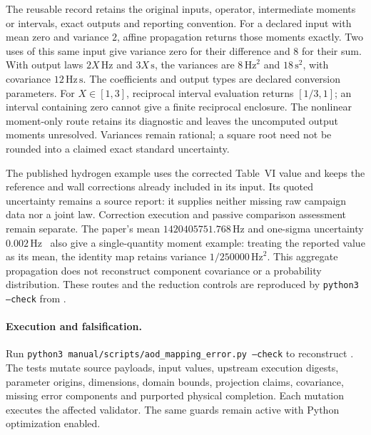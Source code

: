 The reusable record retains the original inputs, operator, intermediate
moments or intervals, exact outputs and reporting convention. For a declared
input with mean zero and variance \(2\), affine propagation returns those
moments exactly. Two uses of this same input give variance zero for their
difference and \(8\) for their sum. With output laws \(2X\,\mathrm{Hz}\)
and \(3X\,\mathrm{s}\), the variances are \(8\,\mathrm{Hz}^2\) and
\(18\,\mathrm{s}^2\), with covariance \(12\,\mathrm{Hz}\,\mathrm{s}\).
The coefficients and output types are declared conversion parameters.
For \(X\in[1,3]\), reciprocal interval evaluation returns \([1/3,1]\);
an interval containing zero cannot give a finite reciprocal enclosure.
The nonlinear moment-only route retains its diagnostic and leaves the
uncomputed output moments unresolved. Variances remain rational; a square root
need not be rounded into a claimed exact standard uncertainty.

The published hydrogen example uses the corrected Table~VI value and keeps
the reference and wall corrections already included in its input. Its quoted
uncertainty remains a source report: it supplies neither missing raw campaign
data nor a joint law. Correction execution and passive comparison assessment
remain separate. The paper's mean \(1420405751.768\,\mathrm{Hz}\) and
one-sigma uncertainty \(0.002\,\mathrm{Hz}\)~\cite{hellwig-hydrogen-1970} also give a single-quantity
moment example: treating the reported value as its mean, the identity map
retains variance \(1/250000\,\mathrm{Hz}^2\). This aggregate propagation
does not reconstruct component covariance or a probability distribution.
These routes and the reduction controls are reproduced by
\texttt{python3}  \texttt{--check}
from .

\paragraph{Execution and falsification.}
Run \texttt{python3 manual/scripts/aod\_mapping\_error.py --check} to
reconstruct .
The tests mutate source payloads, input values,
upstream execution digests, parameter origins, dimensions, domain bounds,
projection claims, covariance, missing error components and purported physical
completion. Each mutation executes the affected validator. The same guards
remain active with Python optimization enabled.
